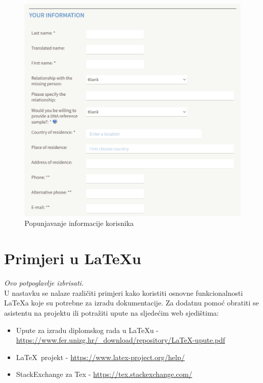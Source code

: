             \begin{figure}[H]
			         \includegraphics[scale=0.5]{slike/ICMP_2.png} %
			         \centering
			         \caption{Popunjavanje informacije korisnika}
			         \label{fig:promjene}
		      \end{figure}


            
			

            
		
		\eject
		
		\section{Primjeri u \LaTeX u}
		
		\textit{Ovo potpoglavlje izbrisati.}\\

		U nastavku se nalaze različiti primjeri kako koristiti osnovne funkcionalnosti \LaTeX a koje su potrebne za izradu dokumentacije. Za dodatnu pomoć obratiti se asistentu na projektu ili potražiti upute na sljedećim web sjedištima:
		\begin{itemize}
			\item Upute za izradu diplomskog rada u \LaTeX u - \url{https://www.fer.unizg.hr/_download/repository/LaTeX-upute.pdf}
			\item \LaTeX\ projekt - \url{https://www.latex-project.org/help/}
			\item StackExchange za Tex - \url{https://tex.stackexchange.com/}\\
		
		\end{itemize} 	


